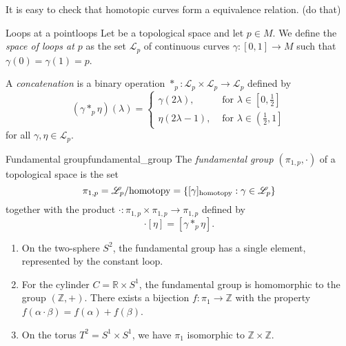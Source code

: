 It is easy to check that homotopic curves form a equivalence relation. (do that)

\begin{definition}{Loops at a point}{loops}
    Let  be a topological space and let \(p \in M\). We define the \emph{space of loops at \(p\)} as the set \(\mathscr{L}_p\) of continuous curves \(\gamma : [0,1] \to M\) such that \(\gamma(0) = \gamma(1) = p\).

    A \emph{concatenation} is a binary operation \(\ast_p : \mathscr{L}_p \times \mathscr{L}_p \to \mathscr{L}_p\) defined by
    \begin{equation*}
        (\gamma \ast_p \eta)(\lambda) = \begin{cases}\gamma(2\lambda), & \text{ for } \lambda \in \left[0,\frac12\right]\\\eta(2\lambda -1), &\text{ for }\lambda \in \left(\frac12, 1\right]\end{cases}
    \end{equation*}
    for all \(\gamma,\eta \in \mathscr{L}_p\).
\end{definition}

\begin{definition}{Fundamental group}{fundamental_group}
    The \emph{fundamental group \((\pi_{1,p}, \cdot)\)} of a topological space is the set
    \begin{equation*}
        \pi_{1,p} = \mathscr{L}_p / \mathrm{homotopy} = \{[\gamma]_{\mathrm{homotopy}} : \gamma \in \mathscr{L}_p\}
    \end{equation*}
    together with the product \(\cdot : \pi_{1,p} \times \pi_{1,p} \to \pi_{1,p}\) defined by
    \begin{equation*}
        [\gamma] \cdot [\eta] = [\gamma \ast_p \eta].
    \end{equation*}
\end{definition}

\begin{example}
    \begin{enumerate}[label=(\alph*)]
        \item On the two-sphere \(S^2\), the fundamental group has a single element, represented by the constant loop.
        \item For the cylinder \(C = \mathbb{R}\times S^1\), the fundamental group is homomorphic to the group \((\mathbb{Z}, +)\). There exists a bijection \(f : \pi_1 \to \mathbb{Z}\) with the property \(f(\alpha\cdot\beta) = f(\alpha) + f(\beta)\).
        \item On the torus \(T^2 = S^1 \times S^1\), we have \(\pi_1\) isomorphic to \(\mathbb{Z}\times\mathbb{Z}\).
    \end{enumerate}
\end{example}

